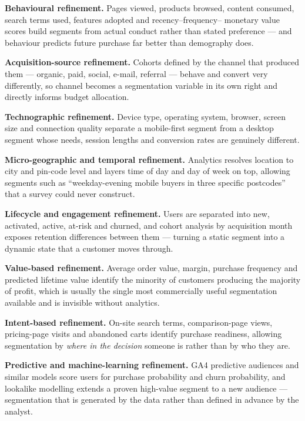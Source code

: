 \begin{qlist}
\begin{apts}
\item \textbf{Behavioural refinement.} Pages viewed, products browsed, content
      consumed, search terms used, features adopted and recency--frequency--
      monetary value scores build segments from actual conduct rather than
      stated preference --- and behaviour predicts future purchase far better
      than demography does.
\item \textbf{Acquisition-source refinement.} Cohorts defined by the channel
      that produced them --- organic, paid, social, e-mail, referral --- behave
      and convert very differently, so channel becomes a segmentation variable
      in its own right and directly informs budget allocation.
\item \textbf{Technographic refinement.} Device type, operating system,
      browser, screen size and connection quality separate a mobile-first
      segment from a desktop segment whose needs, session lengths and
      conversion rates are genuinely different.
\item \textbf{Micro-geographic and temporal refinement.} Analytics resolves
      location to city and pin-code level and layers time of day and day of
      week on top, allowing segments such as ``weekday-evening mobile buyers in
      three specific postcodes'' that a survey could never construct.
\item \textbf{Lifecycle and engagement refinement.} Users are separated into
      new, activated, active, at-risk and churned, and cohort analysis by
      acquisition month exposes retention differences between them --- turning
      a static segment into a dynamic state that a customer moves through.
\item \textbf{Value-based refinement.} Average order value, margin, purchase
      frequency and predicted lifetime value identify the minority of customers
      producing the majority of profit, which is usually the single most
      commercially useful segmentation available and is invisible without
      analytics.
\item \textbf{Intent-based refinement.} On-site search terms, comparison-page
      views, pricing-page visits and abandoned carts identify purchase
      readiness, allowing segmentation by \emph{where in the decision} someone
      is rather than by who they are.
\item \textbf{Predictive and machine-learning refinement.} GA4 predictive
      audiences and similar models score users for purchase probability and
      churn probability, and lookalike modelling extends a proven high-value
      segment to a new audience --- segmentation that is generated by the data
      rather than defined in advance by the analyst.
\end{apts}


\end{qlist}
